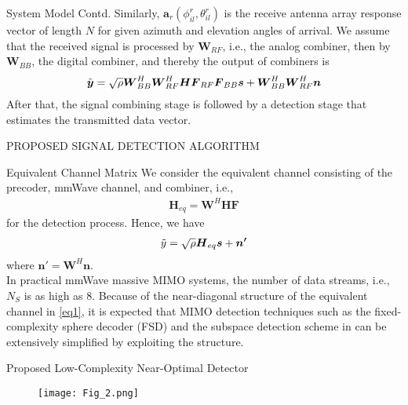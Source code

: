 \documentclass{beamer}
\providecommand{\brak}[1]{\ensuremath{\left(#1\right)}}
\begin{document}
\begin{frame}{System Model Contd.}
Similarly, $\boldsymbol{a}_r\brak{\phi_{il}^r,\theta_{il}^r}$ is the receive antenna array response vector of length $N$ for given azimuth and elevation angles of arrival. We  assume that the received signal is processed by $\boldsymbol{W}_{RF}$, i.e., the analog combiner, then by $\boldsymbol{W}_{BB}$, the digital combiner, and thereby the output of combiners is
\begin{align}
    \Tilde{\boldsymbol{y}} = \sqrt{\rho}\boldsymbol{W}_{BB}^H\boldsymbol{W}_{RF}^H\boldsymbol{HF}_{RF}\boldsymbol{F}_{BB}\boldsymbol{s}+\boldsymbol{W}_{BB}^H\boldsymbol{W}_{RF}^H\boldsymbol{n}
\end{align}
After that, the signal combining stage is followed by a
detection stage that estimates the transmitted data vector.
\end{frame}
 
\begin{frame}{}
\begin{center}
    PROPOSED SIGNAL DETECTION ALGORITHM
\end{center}
\end{frame}

\begin{frame}{Equivalent Channel Matrix}
  We consider the equivalent channel consisting of the precoder, mmWave channel, and combiner, i.e.,
  \begin{align}
      \boldsymbol{H}_{eq} = \boldsymbol{W}^H\boldsymbol{HF} \label{eq1}
  \end{align}
  for the detection process. Hence, we have
  \begin{align}
      \Tilde{y} = \sqrt{\rho}\boldsymbol{H}_{eq}\boldsymbol{s}+\boldsymbol{n'}
  \end{align}
  where $ \boldsymbol{n'} = \boldsymbol{W}^H\boldsymbol{n}$.\\ In practical mmWave massive MIMO systems, the number of data streams, i.e., $N_S$ is as high as 8. Because of
the near-diagonal structure of the equivalent channel in \eqref{eq1}, it is expected that MIMO detection techniques such as the fixed-complexity sphere decoder (FSD) and the subspace
detection scheme in can be extensively simplified by exploiting the structure.
\end{frame}

\begin{frame}{Proposed Low-Complexity Near-Optimal Detector}
\begin{figure}[htp]
    \centering
    \texttt{[image: Fig\_2.png]}
\end{figure}
\end{frame}
\end{document}
